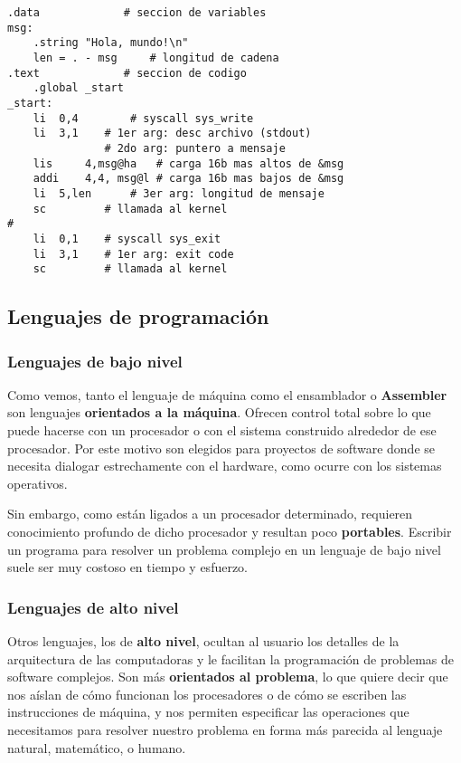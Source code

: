 \documentclass[spanish,A4,]{article}
\begin{document}
\begin{verbatim}
.data             # seccion de variables
msg:
    .string "Hola, mundo!\n"
    len = . - msg     # longitud de cadena
.text             # seccion de codigo
    .global _start
_start:
    li  0,4        # syscall sys_write
    li  3,1    # 1er arg: desc archivo (stdout)
               # 2do arg: puntero a mensaje
    lis     4,msg@ha   # carga 16b mas altos de &msg
    addi    4,4, msg@l # carga 16b mas bajos de &msg
    li  5,len      # 3er arg: longitud de mensaje
    sc         # llamada al kernel
# 
    li  0,1    # syscall sys_exit
    li  3,1    # 1er arg: exit code
    sc         # llamada al kernel
\end{verbatim}

\subsection{Lenguajes de
programación}\label{lenguajes-de-programaciuxf3n}

\subsubsection{Lenguajes de bajo nivel}\label{lenguajes-de-bajo-nivel-1}

Como vemos, tanto el lenguaje de máquina como el ensamblador o
\textbf{Assembler} son lenguajes \textbf{orientados a la máquina}.
Ofrecen control total sobre lo que puede hacerse con un procesador o con
el sistema construido alrededor de ese procesador. Por este motivo son
elegidos para proyectos de software donde se necesita dialogar
estrechamente con el hardware, como ocurre con los sistemas operativos.

Sin embargo, como están ligados a un procesador determinado, requieren
conocimiento profundo de dicho procesador y resultan poco
\textbf{portables}. Escribir un programa para resolver un problema
complejo en un lenguaje de bajo nivel suele ser muy costoso en tiempo y
esfuerzo.

\subsubsection{Lenguajes de alto nivel}\label{lenguajes-de-alto-nivel}

Otros lenguajes, los de \textbf{alto nivel}, ocultan al usuario los
detalles de la arquitectura de las computadoras y le facilitan la
programación de problemas de software complejos. Son más
\textbf{orientados al problema}, lo que quiere decir que nos aíslan de
cómo funcionan los procesadores o de cómo se escriben las instrucciones
de máquina, y nos permiten especificar las operaciones que necesitamos
para resolver nuestro problema en forma más parecida al lenguaje
natural, matemático, o humano.
\end{document}
